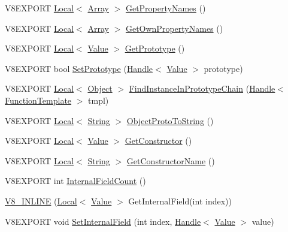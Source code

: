 \begin{DoxyCompactItemize}
\item 
V8\+E\+X\+P\+O\+R\+T \hyperlink{classv8_1_1_local}{Local}$<$ \hyperlink{classv8_1_1_array}{Array} $>$ \hyperlink{classv8_1_1_object_a0e28660353b6da64f9e2769260f31001}{Get\+Property\+Names} ()
\item 
V8\+E\+X\+P\+O\+R\+T \hyperlink{classv8_1_1_local}{Local}$<$ \hyperlink{classv8_1_1_array}{Array} $>$ \hyperlink{classv8_1_1_object_ab407b4e8dc83c3a75197f809d1465f7e}{Get\+Own\+Property\+Names} ()
\item 
V8\+E\+X\+P\+O\+R\+T \hyperlink{classv8_1_1_local}{Local}$<$ \hyperlink{classv8_1_1_value}{Value} $>$ \hyperlink{classv8_1_1_object_a171fc92c6e695d9c944f9e5d7670ed11}{Get\+Prototype} ()
\item 
V8\+E\+X\+P\+O\+R\+T bool \hyperlink{classv8_1_1_object_a2a1ab58bf92984255f767946eeff1199}{Set\+Prototype} (\hyperlink{classv8_1_1_handle}{Handle}$<$ \hyperlink{classv8_1_1_value}{Value} $>$ prototype)
\item 
V8\+E\+X\+P\+O\+R\+T \hyperlink{classv8_1_1_local}{Local}$<$ \hyperlink{classv8_1_1_object}{Object} $>$ \hyperlink{classv8_1_1_object_aa3b8aaece354c6af98b98e0ae9abe13d}{Find\+Instance\+In\+Prototype\+Chain} (\hyperlink{classv8_1_1_handle}{Handle}$<$ \hyperlink{classv8_1_1_function_template}{Function\+Template} $>$ tmpl)
\item 
V8\+E\+X\+P\+O\+R\+T \hyperlink{classv8_1_1_local}{Local}$<$ \hyperlink{classv8_1_1_string}{String} $>$ \hyperlink{classv8_1_1_object_a2dc22d2a2acf9eab4ed2965149e48af9}{Object\+Proto\+To\+String} ()
\item 
V8\+E\+X\+P\+O\+R\+T \hyperlink{classv8_1_1_local}{Local}$<$ \hyperlink{classv8_1_1_value}{Value} $>$ \hyperlink{classv8_1_1_object_a63861862c17e0fb2cf4e2d62b656f548}{Get\+Constructor} ()
\item 
V8\+E\+X\+P\+O\+R\+T \hyperlink{classv8_1_1_local}{Local}$<$ \hyperlink{classv8_1_1_string}{String} $>$ \hyperlink{classv8_1_1_object_a4851a914d3d95b5eb7238c664fb7fd16}{Get\+Constructor\+Name} ()
\item 
V8\+E\+X\+P\+O\+R\+T int \hyperlink{classv8_1_1_object_affaee480d3f50d5ac7a640db5aa8e89d}{Internal\+Field\+Count} ()
\item 
\hyperlink{classv8_1_1_object_a478c557d3d547921436d1f8312deb831}{V8\+\_\+\+I\+N\+L\+I\+N\+E} (\hyperlink{classv8_1_1_local}{Local}$<$ \hyperlink{classv8_1_1_value}{Value} $>$ Get\+Internal\+Field(int index))
\item 
V8\+E\+X\+P\+O\+R\+T void \hyperlink{classv8_1_1_object_a94e24494687ea499471d41e914eeb90d}{Set\+Internal\+Field} (int index, \hyperlink{classv8_1_1_handle}{Handle}$<$ \hyperlink{classv8_1_1_value}{Value} $>$ value)

\end{DoxyCompactItemize}
